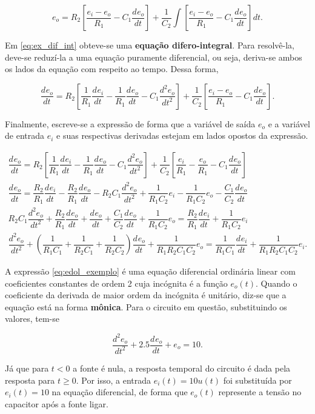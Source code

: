 \documentclass{article}
\numberwithin{equation}{section}
\newcommand{\deo}[1]{\dfrac{d^{#1}e_o}{dt^{#1}}}
\newcommand{\dei}[1]{\dfrac{d^{#1}e_i}{dt^{#1}}}
\let\l\left
\let\r\right
\let\dfr\dfrac
\begin{document}
\begin{equation}
    e_o = R_2\left[\dfr{e_i-e_o}{R_1}-C_1 \deo{}\right] + \dfr{1}{C_2} \int \left[\dfr{e_i-e_o}{R_1} - C_1 \deo{}\right]dt \label{eq:ex_dif_int}.
\end{equation}

\noindent Em \eqref{eq:ex_dif_int} obteve-se uma \textbf{equação difero-integral}. Para resolvê-la, deve-se reduzí-la a uma equação puramente diferencial, ou seja, deriva-se ambos os lados da equação com respeito ao tempo. Dessa forma,

\begin{equation*}
    \deo{} = R_2\l[\dfr{1}{R_1}\dei{}-\dfr{1}{R_1}\deo{}-C_1 \deo{2}\r] + \dfr{1}{C_2}\l[\dfr{e_i-e_o}{R_1} - C_1 \deo{}\r].
\end{equation*}

\noindent Finalmente, escreve-se a expressão de forma que a variável de saída $e_{o}$ e a variável de entrada $e_{i}$ e suas respectivas derivadas estejam em lados opostos da expressão.

\begin{gather}
    \deo{} = R_2 \l[\dfr{1}{R_1} \dei{} - \dfr{1}{R_1}\deo{} - C_1 \deo{2}\r] + \dfr{1}{C_2}\l[\dfr{e_i}{R_1} - \dfr{e_o}{R_1} - C_1 \deo{}\r] \nonumber
    \\
    \deo{} = \dfr{R_2}{R_1}\dei{}-\dfr{R_2}{R_1}\deo{} - R_2C_1 \deo{2} + \dfr{1}{R_1C_2}e_i - \dfr{1}{R_1C_2} e_o - \dfr{C_1}{C_2}\deo{} \nonumber
    \\
    R_2C_1 \deo{2} + \dfr{R_2}{R_1} \deo{} + \deo{} + \dfr{C_1}{C_2} \deo{} + \dfr{1}{R_1C_2}e_o = \dfr{R_2}{R_1} \dei{} + \dfr{1}{R_1C_2}e_i \nonumber
    \\
    \deo{2} + \l(\dfr{1}{R_1C_1} + \dfr{1}{R_2C_1} + \dfr{1}{R_2C_2}\r)\deo{} + \dfr{1}{R_1R_2C_1C_2}e_o = \dfr{1}{R_1C_1}\dei{} + \dfr{1}{R_1R_2C_1C_2}e_i. \label{eq:edol_exemplo}
\end{gather}

\noindent A expressão \eqref{eq:edol_exemplo} é uma equação diferencial ordinária linear com coeficientes constantes de ordem 2 cuja incógnita é a função $e_{o}(t)$. Quando o coeficiente da derivada de maior ordem da incógnita é unitário, diz-se que a equação está na forma \textbf{mônica}. Para o circuito em questão, substituindo os valores, tem-se

\begin{equation}
    \deo{2}+ 2.5 \deo{} + e_o = 10.
\end{equation}

\noindent Já que para $t<0$ a fonte é nula, a resposta temporal do circuito é dada pela resposta para $t \geqslant 0$. Por isso, a entrada $e_i(t)=10u(t)$ foi substituída por $e_i(t)=10$ na equação diferencial, de forma que $e_o(t)$ represente a tensão no capacitor após a fonte ligar.
\end{document}
